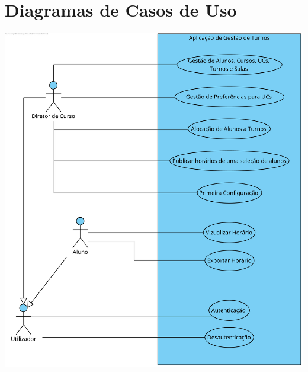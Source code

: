 \documentclass[a4paper,12pt]{scrreprt}
\begin{document}


\chapter{Diagramas de Casos de Uso}
\vspace{1cm}

\begin{minipage}{\textwidth}
    \centering
    \includegraphics[width=1\textwidth]{images/use-cases-diagrams/1-geral.png}
    \label{fig:2-1-diagrama_de_casos_de_uso_geral}
\end{minipage}
\end{document}
